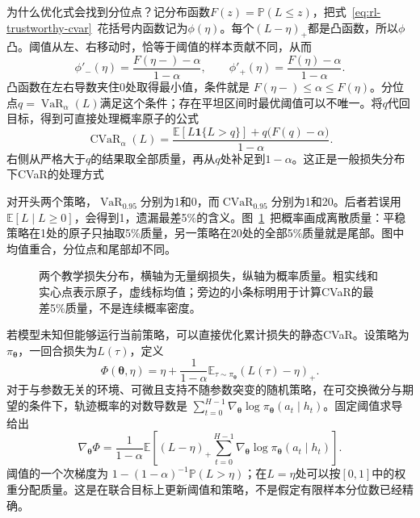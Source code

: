 为什么优化式会找到分位点？记分布函数$F(z)=\mathbb P(L\leq z)$，把式~\eqref{eq:rl-trustworthy-cvar}~花括号内函数记为$\phi(\eta)$。每个$(L-\eta)_+$都是凸函数，所以$\phi$凸。阈值从左、右移动时，恰等于阈值的样本贡献不同，从而
\[
  \phi'_-(\eta)=\frac{F(\eta-)-\alpha}{1-\alpha},
  \qquad
  \phi'_+(\eta)=\frac{F(\eta)-\alpha}{1-\alpha}.
\]
凸函数在左右导数夹住0处取得最小值，条件就是
$F(\eta-)\leq\alpha\leq F(\eta)$。分位点$q=\operatorname{VaR}_\alpha(L)$满足这个条件；存在平坦区间时最优阈值可以不唯一。将$q$代回目标，得到可直接处理概率原子的公式
\begin{equation}
  \operatorname{CVaR}_\alpha(L)=
  \frac{\mathbb E[L\mathbf 1\{L>q\}]
       +q\bigl(F(q)-\alpha\bigr)}{1-\alpha}.
  \label{eq:rl-trustworthy-tail-mass}
\end{equation}
右侧从严格大于$q$的结果取全部质量，再从$q$处补足到$1-\alpha$。这正是一般损失分布下CVaR的处理方式

对开头两个策略，$\operatorname{VaR}_{0.95}$分别为1和0，而$\operatorname{CVaR}_{0.95}$分别为1和20。后者若误用$\mathbb E[L\mid L\geq0]$，会得到1，遗漏最差5\%的含义。图~\ref{fig:rl-trustworthy-loss}~把概率画成离散质量：平稳策略在1处的原子只抽取5\%质量，另一策略在20处的全部5\%质量就是尾部。图中均值重合，分位点和尾部却不同。

\begin{figure}[htbp]
  \centering
  
  \caption{两个教学损失分布，横轴为无量纲损失，纵轴为概率质量。粗实线和实心点表示原子，虚线标均值；旁边的小条标明用于计算CVaR的最差5\%质量，不是连续概率密度。}
  \label{fig:rl-trustworthy-loss}
\end{figure}

若模型未知但能够运行当前策略，可以直接优化累计损失的静态CVaR。设策略为$\pi_{\bm{\theta}}$，一回合损失为$L(\tau)$，定义
\[
  \Phi(\bm{\theta},\eta)
  =\eta+\frac{1}{1-\alpha}
      \mathbb E_{\tau\sim\pi_{\bm{\theta}}}(L(\tau)-\eta)_+.
\]
对于与参数无关的环境、可微且支持不随参数突变的随机策略，在可交换微分与期望的条件下，轨迹概率的对数导数是
$\sum_{t=0}^{H-1}\nabla_{\bm{\theta}}\log\pi_{\bm{\theta}}(a_t\mid h_t)$。固定阈值求导给出
\begin{equation}
  \nabla_{\bm{\theta}}\Phi
  =\frac{1}{1-\alpha}\mathbb E\left[
    (L-\eta)_+
    \sum_{t=0}^{H-1}\nabla_{\bm{\theta}}
       \log\pi_{\bm{\theta}}(a_t\mid h_t)\right].
  \label{eq:rl-trustworthy-tail-gradient}
\end{equation}
阈值的一个次梯度为
$1-(1-\alpha)^{-1}\mathbb P(L>\eta)$；在$L=\eta$处可以按$[0,1]$中的权重分配质量。这是在联合目标上更新阈值和策略，不是假定有限样本分位数已经精确。

